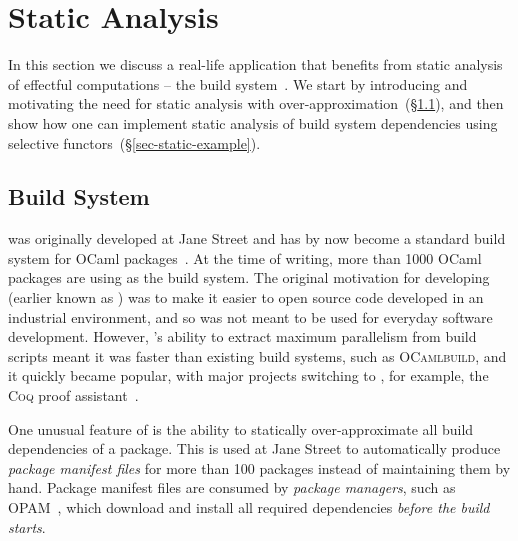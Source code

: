 \section{Static Analysis}\label{sec-static}

In this section we discuss a real-life application that benefits from static
analysis of effectful computations -- the \Dune build system~\citep{dune}. We
start by introducing \Dune and motivating the need for static analysis with
over-approximation~(\S\ref{sec-dune-intro}), and then show how one can implement
static analysis of build system dependencies using selective
functors~(\S\ref{sec-static-example}).

\subsection{\Dune Build System}\label{sec-dune-intro}

\Dune was originally developed at Jane Street and has by now become a standard
build system for OCaml packages~\citep{dune}. At the time of writing, more than
1000 OCaml packages are using \Dune as the build system. The original motivation
for developing \Dune (earlier known as ) was to make it easier
to open source code developed in an industrial environment, and so \Dune was not
meant to be used for everyday software development. However, \Dune's ability to
extract maximum parallelism from build scripts meant it was faster than existing
build systems, such as \textsc{OCamlbuild}, and it quickly became popular, with
major projects switching to \Dune, for example, the \textsc{Coq} proof
assistant~\citep{bertot2013coq}.


One unusual feature of \Dune is the ability to statically
over-approximate all build dependencies of a package. This is used at
Jane Street to automatically produce \emph{package manifest files} for
more than 100 packages instead of maintaining them by hand. Package
manifest files are consumed by \emph{package managers}, such as
OPAM~\citep{opam}, which download and install all required dependencies
\emph{before the build starts}.


